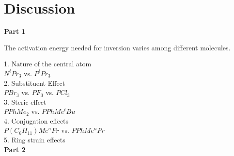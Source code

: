 \documentclass[twocolumn]{article} %
\begin{document}









\section{Discussion}
\textbf{Part 1}

The activation energy needed for inversion varies among different molecules. 

1. Nature of the central atom\\
$N^iPr_3$ vs. $P^iPr_3$\\

2. Substituent Effect\\
$PBr_3$ vs. $PF_3$ vs. $PCl_3$\\

3. Steric effect\\
$PPhMe_2$ vs. $PPhMe^tBu$\\

4. Conjugation effects\\
$P(C_6H_11)Me^nPr$ vs. $PPhMe^nPr$\\

5. Ring strain effects\\



\textbf{Part 2}
\end{document}
